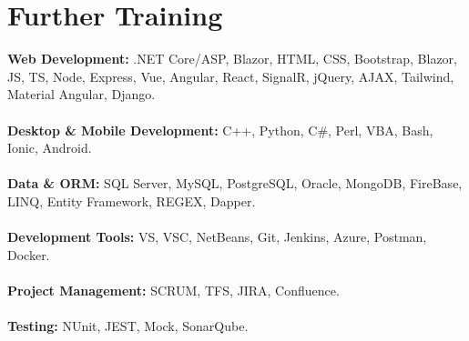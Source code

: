 \documentclass[letterpaper]{twentysecondcv} %
\begin{document}
\section{Further Training}
{
   {\textbf{Web Development:}} .NET Core/ASP, Blazor, HTML, CSS, Bootstrap, Blazor, JS, TS, Node, Express, Vue, Angular, React, SignalR, jQuery, AJAX, Tailwind, Material Angular, Django.\\\\
   {\textbf{Desktop \& Mobile Development:}} C++, Python, C\#, Perl, VBA, Bash, Ionic, Android.\\\\
   {\textbf{Data \& ORM:}} SQL Server, MySQL, PostgreSQL, Oracle, MongoDB, FireBase, LINQ, Entity Framework, REGEX, Dapper.\\\\
   {\textbf{Development Tools:}} VS, VSC, NetBeans, Git, Jenkins, Azure, Postman, Docker.\\\\
   {\textbf{Project Management:}} SCRUM, TFS, JIRA, Confluence.\\\\
   {\textbf{Testing:}} NUnit, JEST, Mock, SonarQube.
}
\end{document}
